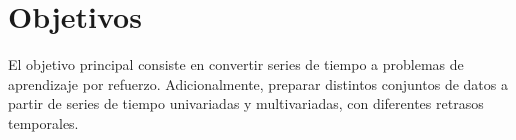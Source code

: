 \section{Objetivos}
El objetivo principal consiste en convertir series de tiempo a problemas de aprendizaje por refuerzo. Adicionalmente, preparar distintos conjuntos de datos a partir de series de tiempo univariadas y multivariadas, con diferentes retrasos temporales.